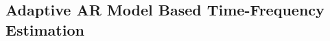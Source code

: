 \documentclass[./main.tex]{subfiles}
\begin{document}
\subsection{Adaptive AR Model Based Time-Frequency Estimation}
\end{document}
